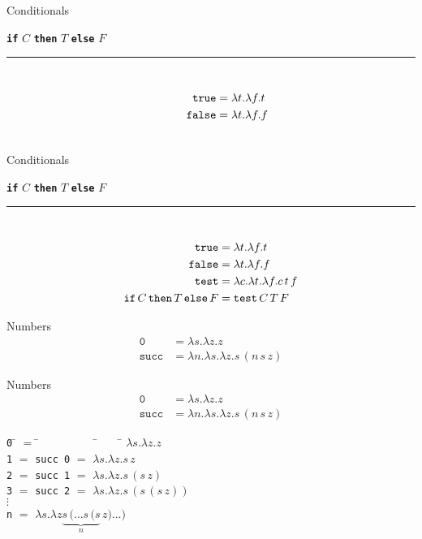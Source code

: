\documentclass{beamer}
\newcommand{\kw}[1]{{\bf \texttt{#1}}}
\newcommand{\mkw}[1]{{\bf \mathtt{#1}}}
\newcommand{\sym}[1]{\texttt{#1}}
\newcommand{\msym}[1]{\mathtt{#1}}
\newcommand{\hr}[0]{\rule{10.75cm}{0.4pt}\\}
\newcommand{\centeredtab}[1]{\begin{center}\parbox{0cm}{\begin{tabbing}#1\end{tabbing}}\end{center}}
\begin{document}
\begin{frame}{Conditionals}
\begin{center}
\kw{if} $C$ \kw{then} $T$ \kw{else} $F$
\end{center}
\hr
\begin{align*}
\msym{true}  &= \lambda t.\lambda f.t \\
\msym{false} &= \lambda t.\lambda f.f
\phantom{\msym{test} = \lambda c.\lambda t.\lambda f.c\,t\,f} \\
\phantom{\mkw{if}\,C\,\mkw{then}\,T\,\mkw{else}\,F = \msym{test}\,C\,T\,F}
\end{align*}
\end{frame}
\begin{frame}{Conditionals}
\begin{center}
\kw{if} $C$ \kw{then} $T$ \kw{else} $F$
\end{center}
\hr
\begin{align*}
\msym{true}  &= \lambda t.\lambda f.t \\
\msym{false} &= \lambda t.\lambda f.f \\
\msym{test} &= \lambda c.\lambda t.\lambda f.c\,t\,f \\
\mkw{if}\,C\,\mkw{then}\,T\,\mkw{else}\,F &= \msym{test}\,C\,T\,F
\end{align*}
\end{frame}
\begin{frame}{Numbers}
\begin{align*}
\msym{0}    &= \lambda s.\lambda z.z \\
\msym{succ} &= \lambda n.\lambda s.\lambda z.s\,(n\,s\,z)
\end{align*}
\end{frame}
\begin{frame}{Numbers}
\begin{align*}
\msym{0}    &= \lambda s.\lambda z.z \\
\msym{succ} &= \lambda n.\lambda s.\lambda z.s\,(n\,s\,z)
\end{align*}
\centeredtab{
\sym{0} \= $=$ \= ~~~~~~~~~    \= ~~~ \= $\lambda s.\lambda z.z$    \\
\sym{1} \> $=$ \> \sym{succ 0} \> $=$ \> $\lambda s.\lambda z.s\,z$ \\
\sym{2} \> $=$ \> \sym{succ 1} \> $=$ \> $\lambda s.\lambda z.s\,(s\,z)$ \\
\sym{3} \> $=$ \> \sym{succ 2} \> $=$ \> $\lambda s.\lambda z.s\,(s\,(s\,z))$ \\
$\vdots$ \\
\sym{n} \> $=$ \> \> \> $\lambda s.\lambda z\underbrace{s\,(\dots s\,(s}_n\,z)\dots)$
}
\end{frame}
\end{document}
